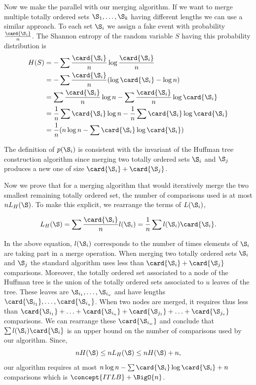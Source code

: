 Now we make the parallel with our merging algorithm. If we want to merge
multiple totally ordered sets \(\S_1,\ldots,\S_k\) having different lengths we can use a similar
approach. To each set \(\S_i\) we assign a fake event with probability
\(\frac{\card{\S_i}}{n}\). The Shannon entropy of the random variable
\(S\) having this probability distribution is
\begin{align}
H(S) &= - \sum \frac{\card{\S_i}}{n} \log \frac{\card{\S_i}}{n}\\
&= - \sum \frac{\card{\S_i}}{n} (\log \card{\S_i} - \log n)\\
&= \sum \frac{\card{\S_i}}{n} \log n - \sum \frac{\card{\S_i}}{n} \log \card{\S_i}\\
&= \frac{1}{n} \sum \card{\S_i} \log n - \frac{1}{n} \sum \card{\S_i} \log
\card{\S_i}\\
&= \frac{1}{n} (n \log n - \sum \card{\S_i} \log \card{\S_i})\\
\end{align}

The definition of \(p(\S_i)\) is consistent with the invariant of
the Huffman tree construction algorithm since merging two totally ordered sets
\(\S_i\) and \(\S_j\) produces a new one of size \(\card{\S_i} + \card{\S_j}\).

Now we prove that for a merging algorithm that would iteratively merge the two
smallest remaining totally ordered set, the number of comparisons used is at
most \(n L_H(\S)\). To make this explicit, we rearrange the terms of \(L(\S_i)\),

\begin{displaymath}
L_H(\S) = \sum \frac{\card{\S_i}}{n} l(\S_i) = \frac{1}{n} \sum l(\S_i) \card{\S_i}.
\end{displaymath}

In the above equation, \(l(\S_i)\) corresponds to the number of times elements
of \(\S_i\) are taking part in a merge operation. When merging two totally
ordered sets \(\S_i\) and \(\S_j\) the standard \tapemerge algorithm uses less
than \(\card{\S_i} + \card{\S_j}\) comparisons. Moreover, the totally ordered set
associated to a node of the Huffman tree is the union of the totally ordered
sets associated to \(u\) leaves of the tree. These leaves are
\(\S_{i_1},\ldots,\S_{i_u}\) and have lengths
\(\card{\S_{i_1}},\ldots,\card{\S_{i_u}}\). When two nodes are merged, it
requires thus less than
\(\card{\S_{i_1}}+\ldots+\card{\S_{i_u}}+\card{\S_{j_1}}+\ldots+\card{\S_{j_v}}\)
comparisons. We can rearrange these \(\card{\S_{i_w}}\) and conclude that
\(\sum l(\S_i) \card{\S_i}\) is an upper bound on the number of comparisons used
by our algorithm. Since,
\begin{displaymath}
n H(\S) \le n L_H(\S) \le n H(\S) + n,
\end{displaymath}
our algorithm requires at most \(n \log n - \sum \card{\S_i} \log \card{\S_i} +
n\) comparisons which is \(\concept{ITLB} + \BigO{n}\).

